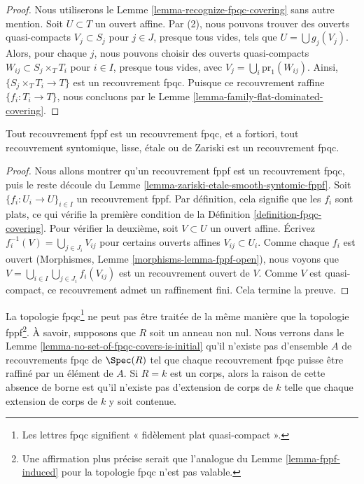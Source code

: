 \begin{proof}
Nous utiliserons le Lemme \ref{lemma-recognize-fpqc-covering} sans autre mention. Soit $U \subset T$ un ouvert affine. Par (2), nous pouvons trouver des ouverts quasi-compacts $V_j \subset S_j$ pour $j \in J$, presque tous vides, tels que $U = \bigcup g_j(V_j)$. Alors, pour chaque $j$, nous pouvons choisir des ouverts quasi-compacts $W_{ij} \subset S_j \times_T T_i$ pour $i \in I$, presque tous vides, avec $V_j = \bigcup_i \text{pr}_1(W_{ij})$. Ainsi, $\{S_j \times_T T_i \to T\}$ est un recouvrement fpqc. Puisque ce recouvrement raffine $\{f_i : T_i \to T\}$, nous concluons par le Lemme \ref{lemma-family-flat-dominated-covering}.
\end{proof}

\begin{lemma}
\label{lemma-zariski-etale-smooth-syntomic-fppf-fpqc}
Tout recouvrement fppf est un recouvrement fpqc, et a fortiori, tout recouvrement syntomique, lisse, étale ou de Zariski est un recouvrement fpqc.
\end{lemma}

\begin{proof}
Nous allons montrer qu'un recouvrement fppf est un recouvrement fpqc, puis le reste découle du Lemme \ref{lemma-zariski-etale-smooth-syntomic-fppf}. Soit $\{f_i : U_i \to U\}_{i \in I}$ un recouvrement fppf. Par définition, cela signifie que les $f_i$ sont plats, ce qui vérifie la première condition de la Définition \ref{definition-fpqc-covering}. Pour vérifier la deuxième, soit $V \subset U$ un ouvert affine. Écrivez $f_i^{-1}(V) = \bigcup_{j \in J_i} V_{ij}$ pour certains ouverts affines $V_{ij} \subset U_i$. Comme chaque $f_i$ est ouvert (Morphismes, Lemme \ref{morphisms-lemma-fppf-open}), nous voyons que $V = \bigcup_{i\in I} \bigcup_{j \in J_i} f_i(V_{ij})$ est un recouvrement ouvert de $V$. Comme $V$ est quasi-compact, ce recouvrement admet un raffinement fini. Cela termine la preuve.
\end{proof}


\noindent
La topologie fpqc\footnote{Les lettres fpqc signifient « fidèlement plat quasi-compact ».} ne peut pas être traitée de la même manière que la topologie fppf\footnote{Une affirmation plus précise serait que l’analogue du Lemme \ref{lemma-fppf-induced} pour la topologie fpqc n'est pas valable.}. À savoir, supposons que $R$ soit un anneau non nul. Nous verrons dans le Lemme \ref{lemma-no-set-of-fpqc-covers-is-initial} qu'il n'existe pas d'ensemble $A$ de recouvrements fpqc de $\Spec(R)$ tel que chaque recouvrement fpqc puisse être raffiné par un élément de $A$. Si $R = k$ est un corps, alors la raison de cette absence de borne est qu'il n'existe pas d'extension de corps de $k$ telle que chaque extension de corps de $k$ y soit contenue.

